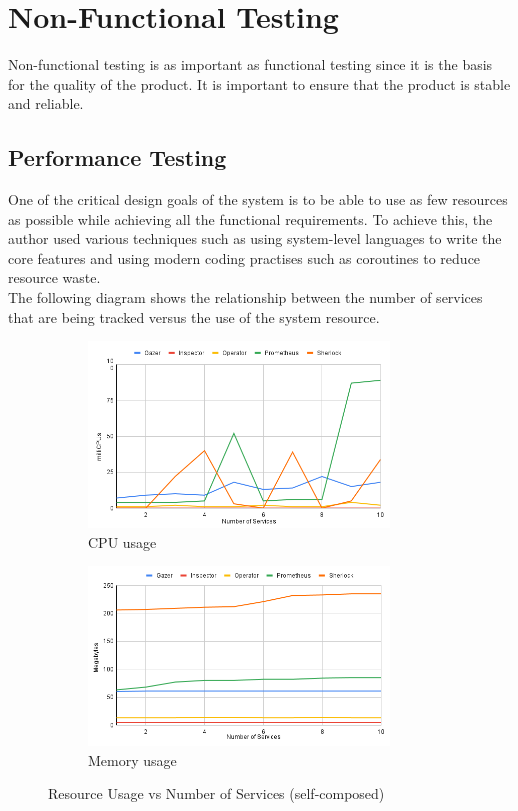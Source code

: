 \section{Non-Functional Testing}

Non-functional testing is as important as functional testing since it is the basis for the quality of the product. It is important to ensure that the product is stable and reliable.

\subsection{Performance Testing} \label{sec:performance-testing}

One of the critical design goals of the system is to be able to use as few resources as possible while achieving all the functional requirements. To achieve this, the author used various techniques such as using system-level languages to write the core features and using modern coding practises such as coroutines to reduce resource waste.\\

\noindent The following diagram shows the relationship between the number of services that are being tracked versus the use of the system resource.

\begin{figure}[H]
    \centering
    \begin{subfigure}[b]{0.49\textwidth}
        \centering
        \includegraphics[width=8cm]{assets/testing/cpu-usage.png}
        \caption{CPU usage}
    \end{subfigure}
    \hfill
    \begin{subfigure}[b]{0.49\textwidth}
        \centering
        \includegraphics[width=8cm]{assets/testing/memory-usage.png}
        \caption{Memory usage}
    \end{subfigure}
    \hfill
    \caption{Resource Usage vs Number of Services (self-composed)}
\end{figure}


